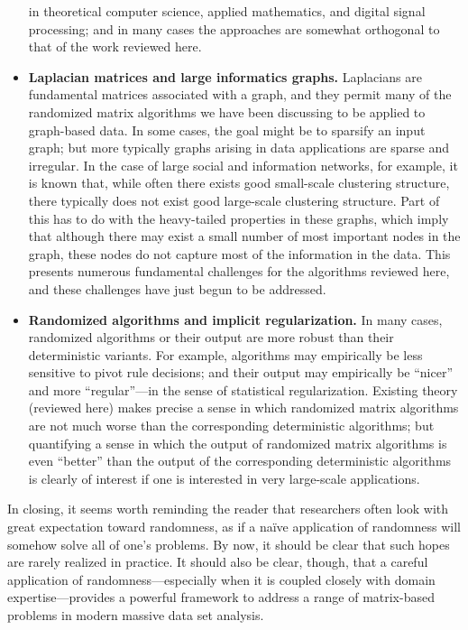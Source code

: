 \documentclass[twoside]{article}
\begin{document}
\begin{itemize}
in theoretical computer science, applied mathematics, and digital signal 
processing; and in many cases the approaches are somewhat orthogonal to that
of the work reviewed here.
\item
\textbf{Laplacian matrices and large informatics graphs.}
Laplacians are fundamental matrices associated with a graph, and they permit
many of the randomized matrix algorithms we have been discussing to be 
applied to graph-based data.
In some cases, the goal might be to sparsify an input graph; but more 
typically graphs arising in data applications are sparse and irregular.
In the case of large social and information networks, for example, it is 
known that, while often there exists good small-scale clustering structure, 
there typically does not exist good large-scale clustering structure.
Part of this has to do with the heavy-tailed properties in these graphs, 
which imply that although there may exist a small number of most important 
nodes in the graph, these nodes do not capture most of the information in 
the data.
This presents numerous fundamental challenges for the algorithms reviewed 
here, and these challenges have just begun to be addressed.
\item
\textbf{Randomized algorithms and implicit regularization.}
In many cases, randomized algorithms or their output are more robust than 
their deterministic variants.
For example, algorithms may empirically be less sensitive to pivot rule 
decisions; and their output may empirically be ``nicer'' and more 
``regular''---in the sense of statistical regularization.
Existing theory (reviewed here) makes precise a sense in which randomized matrix algorithms 
are not much worse than the corresponding deterministic algorithms; but
quantifying a sense in which the output of randomized matrix algorithms
is even ``better'' than the output of the corresponding deterministic 
algorithms is clearly of interest if one is interested in very large-scale 
applications.
\end{itemize}

\noindent
In closing, it seems worth reminding the reader that researchers often look 
with great expectation toward randomness, as if a na\"{i}ve application of 
randomness will somehow solve all of one's problems.
By now, it should be clear that such hopes are rarely realized in practice.
It should also be clear, though, that a careful application of 
randomness---especially when it is coupled closely with domain 
expertise---provides a powerful framework to address a range of matrix-based
problems in modern massive data set analysis.
\end{document}
